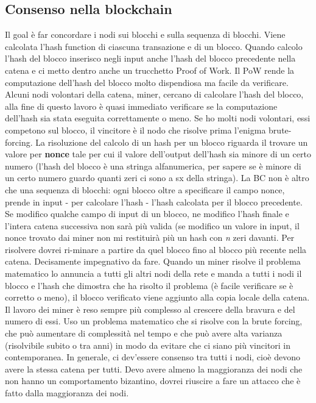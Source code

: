 \documentclass[12pt,italian]{report}
\begin{document}
\subsection{Consenso nella blockchain}
Il goal è far concordare i nodi sui blocchi e sulla sequenza di blocchi. 
\bigbreak
Viene calcolata l'hash function di ciascuna transazione e di un blocco. Quando calcolo l'hash del blocco inserisco negli input anche l'hash del blocco precedente nella catena e ci metto dentro anche un trucchetto Proof of Work. Il PoW rende la computazione dell'hash del blocco molto dispendiosa ma facile da verificare. Alcuni nodi volontari della catena, miner, cercano di calcolare l'hash del blocco, alla fine di questo lavoro è quasi immediato verificare se la computazione dell'hash sia stata eseguita correttamente o meno. Se ho molti nodi volontari, essi competono sul blocco, il vincitore è il nodo che risolve prima l'enigma brute-forcing. 
\bigbreak
La risoluzione del calcolo di un hash per un blocco riguarda il trovare un valore per \textbf{nonce} tale per cui il valore dell'output dell'hash sia minore di un certo numero (l'hash del blocco è una stringa alfanumerica, per sapere se è minore di un certo numero guardo quanti zeri ci sono a sx della stringa).
\bigbreak
La BC non è altro che una sequenza di blocchi: ogni blocco oltre a specificare il campo nonce, prende in input - per calcolare l'hash - l'hash calcolata per il blocco precedente. Se modifico qualche campo di input di un blocco, ne modifico l'hash finale e l'intera catena successiva non sarà più valida (se modifico un valore in input, il nonce trovato dai miner non mi restituirà più un hash con \textit{n} zeri davanti. Per risolvere dovrei ri-minare a partire da quel blocco fino al blocco più recente nella catena. Decisamente impegnativo da fare.
\bigbreak
Quando un miner risolve il problema matematico lo annuncia a tutti gli altri nodi della rete e manda a tutti i nodi il blocco e l'hash che dimostra che ha risolto il problema (è facile verificare se è corretto o meno), il blocco verificato viene aggiunto alla copia locale della catena. 
\bigbreak
Il lavoro dei miner è reso sempre più complesso al crescere della bravura e del numero di essi. Uso un problema matematico che si risolve con la brute forcing, che può aumentare di complessità nel tempo e che può avere alta varianza (risolvibile subito o tra anni) in modo da evitare che ci siano più vincitori in contemporanea. 
\bigbreak
In generale, ci dev'essere consenso tra tutti i nodi, cioè devono avere la stessa catena per tutti. Devo avere almeno la maggioranza dei nodi che non hanno un comportamento bizantino, dovrei riuscire a fare un attacco che è fatto dalla maggioranza dei nodi. 
\end{document}
